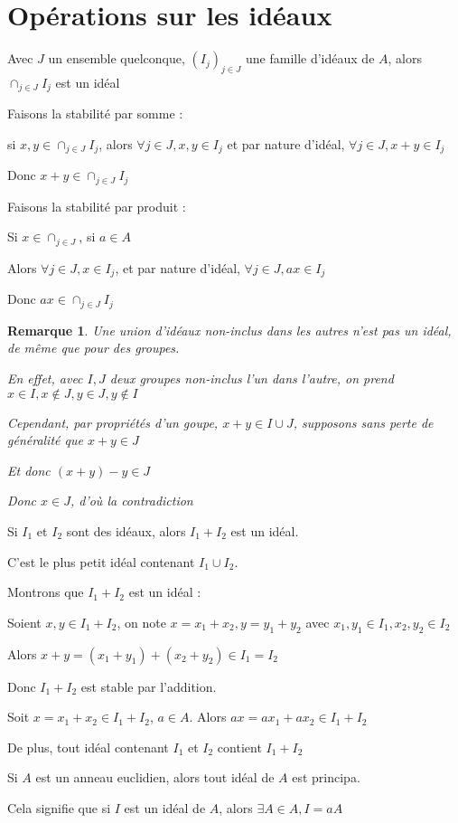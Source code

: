 \documentclass[a4paper,12pt]{book}
\newcommand{\Thr}[2]{\begin{tcolorbox}[sharp corners, colback=white,colframe=red!90!black!75, title=Théorème : #1]#2\end{tcolorbox}}
\newcommand{\Prop}[2]{\begin{tcolorbox}[sharp corners, colback=white,colframe=red!90!black!75, title=Proposition : #1]#2\end{tcolorbox}}
\newcommand{\Pre}[1]{\begin{tcolorbox}[sharp corners, colback=white,colframe=green!60!green!30!black!75, title=Preuve]#1\end{tcolorbox}}
\newtheorem{Rem}{Remarque}[section]
\begin{document}
\section{Opérations sur les idéaux}
\Prop{}{Avec $J$ un ensemble quelconque, $(I_j)_{j\in J}$ une famille d'idéaux de $A$, alors $\cap_{j\in J} I_j$ est un idéal}
\Pre{Faisons la stabilité par somme : \par si $x,y\in\cap_{j\in J}I_j$, alors $\forall j\in J, x,y\in I_j$ et par nature d'idéal, $\forall j\in J, x+y\in I_j$ \par Donc $x+y\in \cap_{j\in J}I_j$
\par Faisons la stabilité par produit : \par Si $x\in\cap_{j\in J}$, si $a\in A$ \par Alors $\forall j\in J, x\in I_j$, et par nature d'idéal, $\forall j\in J, ax\in I_j$ \par Donc $ax\in \cap_{j\in J}I_j$}
\begin{Rem}
Une union d'idéaux non-inclus dans les autres n'est pas un idéal, de même que pour des groupes.
\par En effet, avec $I,J$ deux groupes non-inclus l'un dans l'autre, on prend $x\in I, x\notin J, y\in J, y\notin I$ \par Cependant, par propriétés d'un goupe, $x+y\in I\cup J$, supposons sans perte de généralité que $x+y\in J$ \par Et donc $(x+y)-y\in J$ \par Donc $x\in J$, d'où la contradiction
\end{Rem}
\Prop{}{Si $I_1$ et $I_2$ sont des idéaux, alors $I_1+I_2$ est un idéal. \par C'est le plus petit idéal contenant $I_1\cup I_2$.}
\Pre{Montrons que $I_1+I_2$ est un idéal :
\par Soient $x,y\in I_1+I_2$, on note $x=x_1+x_2, y=y_1+y_2$ avec $x_1,y_1\in I_1, x_2, y_2\in I_2$ \par Alors $x+y = (x_1+y_1)+(x_2+y_2)\in I_1=I_2$ \par Donc $I_1+I_2$ est stable par l'addition. \par Soit $x = x_1+x_2\in I_1+I_2$, $a\in A$. Alors $ax = ax_1 + ax_2 \in I_1+I_2$
\par De plus, tout idéal contenant $I_1$ et $I_2$ contient $I_1+I_2$}
\Thr{}{Si $A$ est un anneau euclidien, alors tout idéal de $A$ est principa.
\par Cela signifie que si $I$ est un idéal de $A$, alors $\exists A\in A, I = aA$}
\end{document}
